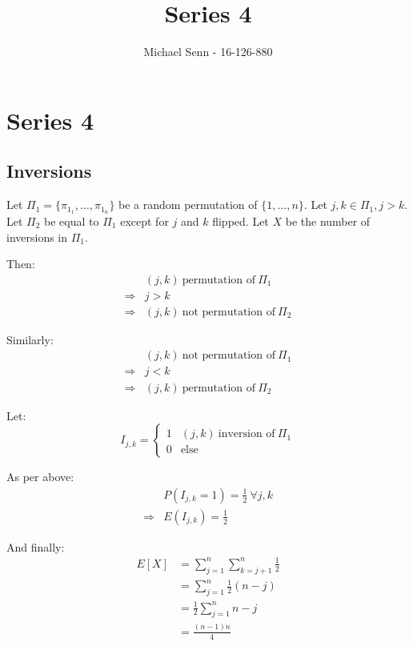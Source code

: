 \documentclass[a4paper]{scrreprt}
\title{Series 4}
\author{Michael Senn \maillink{michael.senn@students.unibe.ch} - 16-126-880}
\date{\printdate}
\begin{document}
\maketitle


\setcounter{chapter}{3}
\chapter{Series 4}

\section{Inversions}

Let $\Pi_1 = \{\pi_{1_1}, \ldots, \pi_{1_n}\}$ be a random permutation of $\{1,
\ldots, n\}$. Let $j, k \in \Pi_1, j > k$. Let $\Pi_2$ be equal to $\Pi_1$
except for $j$ and $k$ flipped. Let $X$ be the number of inversions in $\Pi_1$.

Then:
\begin{align*}
	& (j, k)\ \text{permutation of}\ \Pi_1 \\
	\Rightarrow & j > k \\
	\Rightarrow & (j, k)\ \text{not permutation of}\ \Pi_2
\end{align*}

Similarly:
\begin{align*}
	& (j, k)\ \text{not permutation of}\ \Pi_1 \\
	\Rightarrow & j < k \\
	\Rightarrow & (j, k)\ \text{permutation of}\ \Pi_2
\end{align*}

Let:
\[
	I_{j,k} =
	\begin{cases}
		1 & (j, k)\ \text{inversion of}\ \Pi_1 \\
		0 & \text{else}
	\end{cases}
\]

As per above:
\begin{align*}
	& P(I_{j, k} = 1) = \frac{1}{2}\ \forall j, k \\
	\Rightarrow & E(I_{j, k}) = \frac{1}{2}
\end{align*}

And finally:
\begin{align*}
	E[X] & = \sum_{j=1}^n{\sum_{k=j+1}^n{\frac{1}{2}}} \\
	& = \sum_{j=1}^n{\frac{1}{2} (n-j)} \\
	& = \frac{1}{2} \sum_{j=1}^n{n-j} \\
	& = \frac{(n-1) n}{4}
\end{align*}
\end{document}
